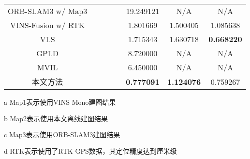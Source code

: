 \begin{table}
\begin{threeparttable}[c]
\begin{tabular}{c|cccc|ccc}
ORB-SLAM3 w/ Map3                      &                                                                            &                      &                      &                      & 19.249121         & N/A               & N/A               \\
VINS-Fusion w/  RTK &                                                                            &                      &                      &                      & 1.801669          & 1.500405          & 1.085638          \\
VLS                                    &                                                                            &                      &                      &                      & 1.715343          & 1.630718          & \cellcolor[HTML]{FA7F6F}\textbf{0.668220} \\
GPLD                                   &                                                                            &                      &                      &                      & 8.720000          & N/A               & N/A               \\
MVIL                                   &                                                                            &                      &                      &                      & 6.450000          & N/A               & N/A               \\
本文方法                                   &                                                                            &                      &                      &                      & \cellcolor[HTML]{FA7F6F}\textbf{0.777091} & \cellcolor[HTML]{FA7F6F}\textbf{1.124076} & 0.759267          \\ \bottomrule
\end{tabular}
\label{tab:loc_4seasons_of2}
\begin{tablenotes}
  \item [a] Map1表示使用VINS-Mono建图结果
  \item [b] Map2表示使用本文离线建图结果
  \item [c] Map3表示使用ORB-SLAM3建图结果
  \item [d] RTK表示使用了RTK-GPS数据，其定位精度达到厘米级
\end{tablenotes}
\end{threeparttable}
\end{table}

